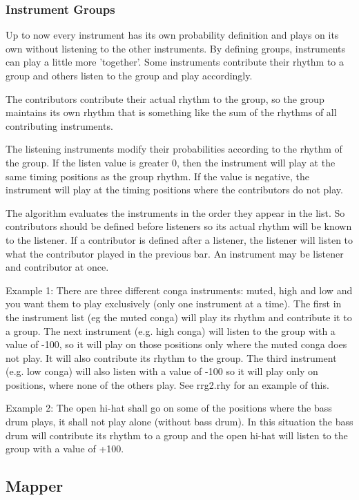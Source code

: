 \documentclass[letterpaper]{report}
\begin{document}
\subsubsection{Instrument Groups}

Up to now every instrument has its own probability definition and plays
on its own without listening to the other instruments. By defining groups,
instruments can play a little more 'together'. Some instruments contribute
their rhythm to a group and others listen to the group and play
accordingly.

The contributors contribute their actual rhythm to the group, so the group
maintains its own rhythm that is something like the sum of the rhythms of
all contributing instruments.

The listening instruments modify their probabilities according to the
rhythm of the group. If the listen value is greater 0, then the instrument
will play at the same timing positions as the group rhythm. If the value
is negative, the instrument will play at the timing positions where the
contributors do not play.

The algorithm evaluates the instruments in the order they appear in the
list. So contributors should be defined before listeners so its actual rhythm
will be known to the listener. If a contributor is
defined after a listener, the listener will listen to what the contributor
played in the previous bar. An instrument may be listener and contributor
at once.

Example 1: There are three different conga instruments: muted,  high and low
and you want them to play exclusively (only one instrument at a time). The
first in the instrument list (eg the muted conga) will play its rhythm and
contribute it to a group. The next instrument (e.g. high conga) will listen
to the group with a value of -100, so it will play on those positions only
where the muted conga does not play. It will also contribute its
rhythm to the group. The third instrument (e.g. low conga) will also listen
with a value of -100 so it will play only on positions, where none of the
others play. See rrg2.rhy for an example of this.

Example 2: The open hi-hat shall go on some of the positions where the
bass drum plays, it shall not play alone (without bass drum). In this
situation the bass drum will contribute its rhythm to a group and the
open hi-hat will listen to the group with a value of +100.



\subsection{Mapper}\label{mapper}
\end{document}
